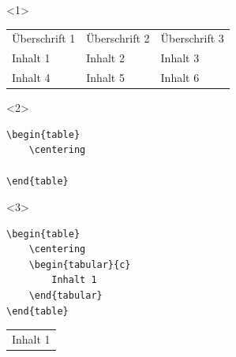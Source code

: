 \documentclass["WS\space 16-17\space -\space LaTeX-Kurs\space -\space Praesentation\space -\space 2.tex"]{subfiles}
\begin{document}
\begin{frame}[fragile]
	\begin{onlyenv}
	\Ausgabe
	\begin{outputbox}
		\begin{table}
			\centering
			\begin{tabular}{lll}
				Überschrift 1	&	Überschrift 2	&	Überschrift 3	\\
				Inhalt 1		&	Inhalt 2		&	Inhalt 3	\\
				Inhalt 4		&	Inhalt 5		&	Inhalt 6	\\
			\end{tabular}
			\end{table}
		\end{outputbox}
	\end{onlyenv}

	\begin{onlyenv}
		\Code
		\begin{lstlisting}
\begin{table}
	\centering
	
\end{table}
		\end{lstlisting}
		\Ausgabe
		\begin{outputbox}
			\begin{table}
				\centering
	
			\end{table}
		\end{outputbox}
	\end{onlyenv}

	\begin{onlyenv}
		\Code
		\begin{lstlisting}
\begin{table}
	\centering
	\begin{tabular}{c}
		Inhalt 1
	\end{tabular}
\end{table}
		\end{lstlisting}
		\Ausgabe
		\begin{outputbox}
			\begin{table}
				\centering
				\begin{tabular}{c}
					Inhalt 1
				\end{tabular}
			\end{table}
		\end{outputbox}
	\end{onlyenv}
	

\end{frame}
\end{document}
